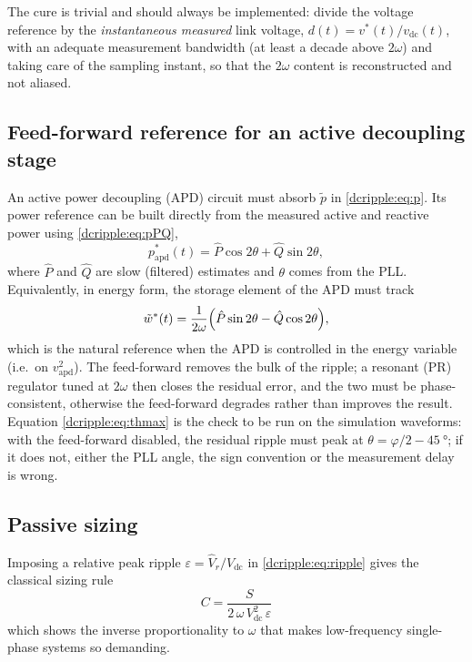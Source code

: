 The cure is trivial and should always be implemented: divide the voltage
reference by the \emph{instantaneous measured} link voltage,
$d(t)=v^{*}(t)/v_{\mathrm{dc}}(t)$, with an adequate measurement bandwidth
(at least a decade above $2\omega$) and taking care of the sampling instant, so
that the $2\omega$ content is reconstructed and not aliased.

\subsection{Feed-forward reference for an active decoupling stage}

An active power decoupling (APD) circuit must absorb $\tilde p$ in
\eqref{dcripple:eq:p}. Its power reference can be built directly from the measured
active and reactive power using \eqref{dcripple:eq:pPQ},
\begin{equation}
  p^{*}_{\mathrm{apd}}(t) = \hat P \cos 2\theta + \hat Q \sin 2\theta ,
\end{equation}
where $\hat P$ and $\hat Q$ are slow (filtered) estimates and $\theta$ comes
from the PLL. Equivalently, in energy form, the storage element of the APD must
track
\begin{equation}
  \tilde w^{*}(t) = \frac{1}{2\omega}
  \Bigl(\hat P \sin 2\theta - \hat Q \cos 2\theta\Bigr),
\end{equation}
which is the natural reference when the APD is controlled in the
energy variable (i.e.\ on $v_{\mathrm{apd}}^2$). The feed-forward removes the
bulk of the ripple; a resonant (PR) regulator tuned at $2\omega$ then closes the
residual error, and the two must be phase-consistent, otherwise the
feed-forward degrades rather than improves the result. Equation
\eqref{dcripple:eq:thmax} is the check to be run on the simulation waveforms: with the
feed-forward disabled, the residual ripple must peak at
$\theta = \varphi/2 - \SI{45}{\degree}$; if it does not, either the PLL angle,
the sign convention or the measurement delay is wrong.

\subsection{Passive sizing}

Imposing a relative peak ripple $\varepsilon = \hat V_r / V_{\mathrm{dc}}$ in
\eqref{dcripple:eq:ripple} gives the classical sizing rule
\begin{equation}
  \boxed{\;
  C = \frac{S}{2\,\omega\, V_{\mathrm{dc}}^{2}\, \varepsilon} \;}
  \label{dcripple:eq:C}
\end{equation}
which shows the inverse proportionality to $\omega$ that makes low-frequency
single-phase systems so demanding.

